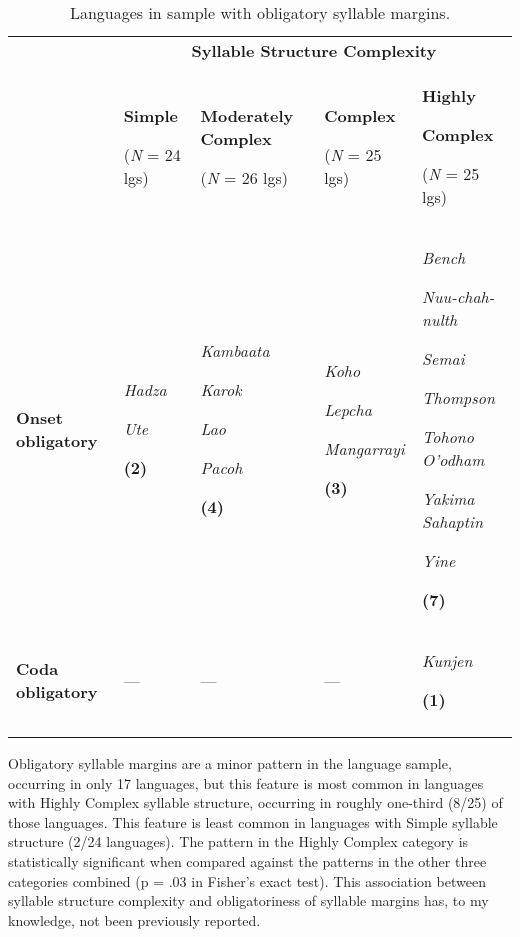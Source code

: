 \begin{table}
\begin{tabularx}{\textwidth}{XXXXX}
 & \multicolumn{4}{c}{ \textbf{Syllable Structure Complexity}}\\
\lsptoprule
& { \textbf{Simple}}

 (\textit{N} = 24 lgs) & { \textbf{Moderately Complex}}

 (\textit{N} = 26 lgs) & { \textbf{Complex}}

 (\textit{N} = 25 lgs) & { \textbf{Highly} }

{ \textbf{Complex}}

 (\textit{N} = 25 lgs)\\
\textbf{Onset obligatory} & { \textit{Hadza}}

{ \textit{Ute}}

 \textbf{(2)} & { \textit{Kambaata}}

{ \textit{Karok}}

{ \textit{Lao}}

{ \textit{Pacoh}}

 \textbf{(4)} & { \textit{Koho}}

{ \textit{Lepcha}}

{ \textit{Mangarrayi}}

 \textbf{(3)} & { \textit{Bench}}

{ \textit{Nuu-chah-nulth}}

{ \textit{Semai}}

{ \textit{Thompson}}

{ \textit{Tohono O’odham}}

{ \textit{Yakima Sahaptin}}

{ \textit{Yine}}

 \textbf{(7)}\\
\textbf{Coda obligatory} & — & — & — & { \textit{Kunjen}}

 \textbf{(1)}\\
\lspbottomrule
\end{tabularx}
\caption{\label{tab:3.4}Languages in sample with obligatory syllable margins.}
\end{table}

  Obligatory syllable margins are a minor pattern in the language sample, occurring in only 17 languages, but this feature is most common in languages with Highly Complex syllable structure, occurring in roughly one-third (8/25) of those languages. This feature is least common in languages with Simple syllable structure (2/24 languages). The pattern in the Highly Complex category is statistically significant when compared against the patterns in the other three categories combined (p = .03 in Fisher’s exact test). This association between syllable structure complexity and obligatoriness of syllable margins has, to my knowledge, not been previously reported.

